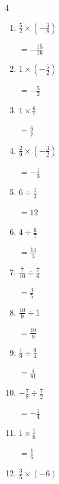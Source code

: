 \begin{multicols}{4}
\begin{enumerate}
        $\displaystyle =\frac{21}{8}$

  \item $\displaystyle \frac{5}{2}\times{}\left(-\frac{3}{8}\right)$

        $\displaystyle =-\frac{15}{16}$

  \item $\displaystyle 1\times{}\left(-\frac{5}{2}\right)$

        $\displaystyle =-\frac{5}{2}$

\columnbreak %

  \item $\displaystyle 1\times{}\frac{6}{7}$

        $\displaystyle =\frac{6}{7}$

  \item $\displaystyle \frac{2}{9}\times{}\left(-\frac{3}{2}\right)$

        $\displaystyle =-\frac{1}{3}$

  \item $\displaystyle 6\div{}\frac{1}{2}$

        $\displaystyle =12$

  \item $\displaystyle 4\div{}\frac{6}{7}$

        $\displaystyle =\frac{14}{3}$

  \item $\displaystyle \frac{7}{10}\div{}\frac{7}{6}$

        $\displaystyle =\frac{3}{5}$

  \item $\displaystyle \frac{10}{9}\div{}1$

        $\displaystyle =\frac{10}{9}$

  \item $\displaystyle \frac{1}{9}\div{}\frac{9}{4}$

        $\displaystyle =\frac{4}{81}$

  \item $\displaystyle -\frac{7}{8}\div{}\frac{7}{2}$

        $\displaystyle =-\frac{1}{4}$

  \item $\displaystyle 1\times{}\frac{1}{6}$

        $\displaystyle =\frac{1}{6}$

  \item $\displaystyle \frac{3}{5}\times{}\left(-6\right)$


\end{enumerate}
\end{multicols}
